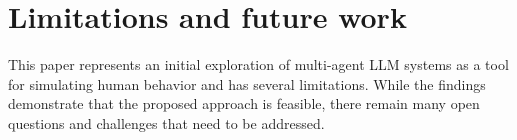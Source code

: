 

\section{Limitations and future work}
This paper represents an initial exploration of multi-agent LLM systems as a tool for simulating human behavior and has several limitations. While the findings demonstrate that the proposed approach is feasible, there remain many open questions and challenges that need to be addressed.

